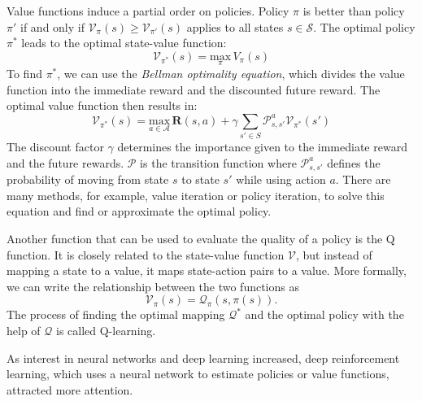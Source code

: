 Value functions induce a partial order on policies. Policy $\pi$ is better than policy $\pi'$ if and only if $\mathcal{V}_\pi(s) \geq \mathcal{V}_{\pi'}(s)$ applies to all states $s \in \mathcal{S}$. The optimal policy $\pi^*$ leads to the optimal state-value function:
\begin{equation*}
  \mathcal{V}_{\pi^*}(s) = \underset{\pi}{\text{max}} \, V_\pi(s)
\end{equation*}
To find $\pi^*$, we can use the \textit{Bellman optimality equation}, which divides the value function into the immediate reward and the discounted future reward. The optimal value function then results in:
\begin{equation*}
  \mathcal{V}_{\pi^*}(s) = \underset{a \in \mathcal{A}}{\text{max}} \, \mathbf{R}(s, a) + \gamma \underset{s' \in S}{\sum} \mathcal{P}_{s, s'}^{a} \mathcal{V}_{\pi^*}(s')
\end{equation*}
The discount factor $\gamma$ determines the importance given to the immediate reward and the future rewards. $\mathcal{P}$ is the transition function where $\mathcal{P}_{s, s'}^{a}$ defines the probability of moving from state $s$ to state $s'$ while using action $a$. There are many methods, for example, value iteration or policy iteration, to solve this equation and find or approximate the optimal policy.

Another function that can be used to evaluate the quality of a policy is the Q function. It is closely related to the state-value function $\mathcal{V}$, but instead of mapping a state to a value, it maps state-action pairs to a value. More formally, we can write the relationship between the two functions as
\begin{equation*}
  \mathcal{V}_{\pi}(s) = \mathcal{Q}_\pi (s, \pi(s)).
\end{equation*}
The process of finding the optimal mapping $\mathcal{Q}^*$ and the optimal policy with the help of $\mathcal{Q}$ is called Q-learning.



As interest in neural networks and deep learning increased, deep reinforcement learning, which uses a neural network to estimate policies or value functions, attracted more attention.


